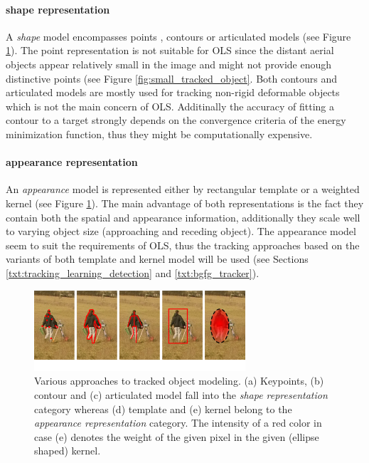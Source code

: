 \paragraph{shape representation} 
A \textit{shape} model encompasses points \cite{Tomasi91detectionand}, contours \cite{Kass88snakes:active, ActiveContour-BasedVisualTracking} or articulated models \cite{Delamarre2001328, conf/isvc/MigniotA13} (see Figure \ref{fig:object_models}). The point representation is not suitable for OLS since the distant aerial objects appear relatively small in the image and might not provide enough distinctive points (see Figure \ref{fig:small_tracked_object}. Both contours and articulated models are mostly used for tracking non-rigid deformable objects which is not the main concern of OLS. Additinally the accuracy of fitting a contour to a target strongly depends on the convergence criteria of the energy minimization function, thus they might be computationally expensive.

\paragraph{appearance representation} 
An \textit{appearance} model is represented either by rectangular template \cite{ProbabilisticVisualTrackingTemplate, ObjectTrackinginMonochromaticVideo} or a weighted kernel \cite{Comaniciu:2003:KOT:776753.776799, MultipleCollaborativeKernelTracking} (see Figure \ref{fig:object_models}). The main advantage of both representations is the fact they contain both the spatial and appearance information, additionally they scale well to varying object size (approaching and receding object). The appearance model seem to suit the requirements of OLS, thus the tracking approaches based on the variants of both template and kernel model will be used (see Sections \ref{txt:tracking_learning_detection} and \ref{txt:bgfg_tracker}).

\begin{figure}[tbh]
	\centering
	\includegraphics[width=0.7\textwidth]{fig/object_model.png}
	\caption{Various approaches to tracked object modeling. (a) Keypoints, (b) contour and (c) articulated model fall into the \textit{shape representation} category whereas (d) template and (e) kernel belong to the \textit{appearance representation} category. The intensity of a red color in case (e) denotes the weight of the given pixel in the given (ellipse shaped) kernel.}
	\label{fig:object_models}
\end{figure}

